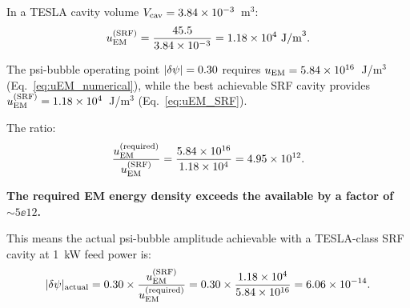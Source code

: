 In a TESLA cavity volume $V_{\rm cav} = 3.84\times 10^{-3}$~m$^3$:
\begin{equation}
u_{\rm EM}^{(\rm SRF)} = \frac{45.5}{3.84\times 10^{-3}} = 1.18\times 10^{4}~\text{J/m}^3.
\label{eq:uEM_SRF}
\end{equation}

\begin{correction}
\label{corr:energy_gap}
The psi-bubble operating point $|\delta\psi| = 0.30$ requires
$u_{\rm EM} = 5.84\times 10^{16}$~J/m$^3$ (Eq.~\ref{eq:uEM_numerical}), while the
best achievable SRF cavity provides
$u_{\rm EM}^{(\rm SRF)} = 1.18\times 10^{4}$~J/m$^3$ (Eq.~\ref{eq:uEM_SRF}).

The ratio:
\begin{equation}
\frac{u_{\rm EM}^{(\rm required)}}{u_{\rm EM}^{(\rm SRF)}}
= \frac{5.84\times 10^{16}}{1.18\times 10^{4}} = 4.95\times 10^{12}.
\label{eq:energy_gap}
\end{equation}

\textbf{The required EM energy density exceeds the available by a factor of
$\sim 5\ee{12}$.}

This means the actual psi-bubble amplitude achievable with a TESLA-class SRF
cavity at 1~kW feed power is:
\begin{equation}
|\delta\psi|_{\rm actual} = 0.30 \times \frac{u_{\rm EM}^{(\rm SRF)}}{u_{\rm EM}^{(\rm required)}}
= 0.30 \times \frac{1.18\times 10^{4}}{5.84\times 10^{16}}
= 6.06\times 10^{-14}.
\label{eq:dpsi_actual}
\end{equation}
\end{correction}

